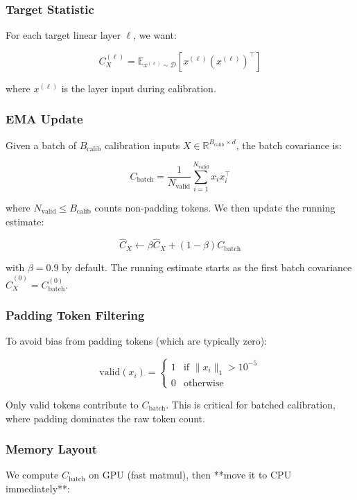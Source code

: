 \subsubsection{Target Statistic}

For each target linear layer $\ell$, we want:

\[
C_X^{(\ell)} = \mathbb{E}_{x^{(\ell)} \sim \mathcal{D}}\!\left[x^{(\ell)} (x^{(\ell)})^\top\right]
\tag{4.1}
\]

where $x^{(\ell)}$ is the layer input during calibration.

\subsubsection{EMA Update}

Given a batch of $B_\text{calib}$ calibration inputs $X \in \mathbb{R}^{B_\text{calib} \times d}$, 
the batch covariance is:

\[
C_\text{batch} = \frac{1}{N_\text{valid}} \sum_{i=1}^{N_\text{valid}} x_i x_i^\top
\tag{4.2}
\]

where $N_\text{valid} \leq B_\text{calib}$ counts non-padding tokens. We 
then update the running estimate:

\[
\hat{C}_X \leftarrow \beta \hat{C}_X + (1 - \beta) C_\text{batch}
\tag{4.3}
\]

with $\beta = 0.9$ by default. The running estimate starts as the first 
batch covariance $\hat{C}_X^{(0)} = C_\text{batch}^{(0)}$.

\subsubsection{Padding Token Filtering}

To avoid bias from padding tokens (which are typically zero):

\[
\text{valid}(x_i) = \begin{cases} 1 & \text{if } \|x_i\|_1 > 10^{-5} \\ 0 & \text{otherwise} \end{cases}
\tag{4.4}
\]

Only valid tokens contribute to $C_\text{batch}$. This is critical for 
batched calibration, where padding dominates the raw token count.

\subsubsection{Memory Layout}

We compute $C_\text{batch}$ on GPU (fast matmul), then **move it to CPU 
immediately**:

